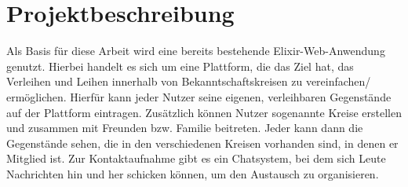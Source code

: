 \section{Projektbeschreibung}
Als Basis für diese Arbeit wird eine bereits bestehende Elixir-Web-Anwendung genutzt. Hierbei handelt  es sich um eine Plattform, die das Ziel hat, das Verleihen und Leihen innerhalb von Bekanntschaftskreisen zu vereinfachen/ ermöglichen. Hierfür kann jeder Nutzer seine eigenen, verleihbaren Gegenstände auf der Plattform eintragen. Zusätzlich können Nutzer sogenannte Kreise erstellen und zusammen mit Freunden bzw. Familie beitreten. Jeder kann dann die Gegenstände sehen, die in den verschiedenen Kreisen vorhanden sind, in denen er Mitglied ist. Zur Kontaktaufnahme gibt es ein Chatsystem, bei dem sich Leute Nachrichten hin und her schicken können, um den Austausch zu organisieren.